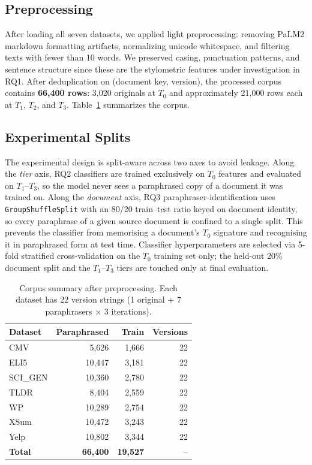 \subsection{Preprocessing}

After loading all seven datasets, we applied light preprocessing: removing PaLM2 markdown formatting artifacts, normalizing unicode whitespace, and filtering texts with fewer than 10 words. We preserved casing, punctuation patterns, and sentence structure since these are the stylometric features under investigation in RQ1. After deduplication on (document key, version), the processed corpus contains \textbf{66,400 rows}: 3,020 originals at $T_0$ and approximately 21,000 rows each at $T_1$, $T_2$, and $T_3$. Table~\ref{tab:corpus_stats} summarizes the corpus.

\subsection{Experimental Splits}

The experimental design is split-aware across two axes to avoid leakage. Along the \emph{tier} axis, RQ2 classifiers are trained exclusively on $T_0$ features and evaluated on $T_1$--$T_3$, so the model never sees a paraphrased copy of a document it was trained on. Along the \emph{document} axis, RQ3 paraphraser-identification uses \texttt{GroupShuffleSplit} with an 80/20 train--test ratio keyed on document identity, so every paraphrase of a given source document is confined to a single split. This prevents the classifier from memorising a document's $T_0$ signature and recognising it in paraphrased form at test time. Classifier hyperparameters are selected via 5-fold stratified cross-validation on the $T_0$ training set only; the held-out 20\% document split and the $T_1$--$T_3$ tiers are touched only at final evaluation.

\begin{table}[h]
\centering
\small
\begin{tabular}{lrrr}
\toprule
\textbf{Dataset} & \textbf{Paraphrased} & \textbf{Train} & \textbf{Versions} \\
\midrule
CMV & 5,626 & 1,666 & 22 \\
ELI5 & 10,447 & 3,181 & 22 \\
SCI\_GEN & 10,360 & 2,780 & 22 \\
TLDR & 8,404 & 2,559 & 22 \\
WP & 10,289 & 2,754 & 22 \\
XSum & 10,472 & 3,243 & 22 \\
Yelp & 10,802 & 3,344 & 22 \\
\midrule
\textbf{Total} & \textbf{66,400} & \textbf{19,527} & -- \\
\bottomrule
\end{tabular}
\caption{Corpus summary after preprocessing. Each dataset has 22 version strings (1 original + 7 paraphrasers $\times$ 3 iterations).}
\label{tab:corpus_stats}
\end{table}
